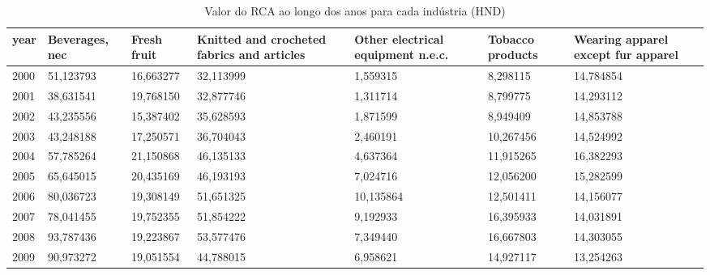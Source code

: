 \begin{table}
\centering
\caption{Valor do RCA ao longo dos anos para cada indústria (HND)}
\begin{tabular}{p{1cm}p{2cm}p{2cm}p{2cm}p{2cm}p{2cm}p{2cm}}
\toprule
 year &  Beverages, nec &  Fresh fruit &  Knitted and crocheted fabrics and articles &  Other electrical equipment n.e.c. &  Tobacco products &  Wearing apparel except fur apparel \\
\midrule
 2000 &       51,123793 &    16,663277 &                                   32,113999 &                           1,559315 &          8,298115 &                           14,784854 \\
 2001 &       38,631541 &    19,768150 &                                   32,877746 &                           1,311714 &          8,799775 &                           14,293112 \\
 2002 &       43,235556 &    15,387402 &                                   35,628593 &                           1,871599 &          8,949409 &                           14,853788 \\
 2003 &       43,248188 &    17,250571 &                                   36,704043 &                           2,460191 &         10,267456 &                           14,524992 \\
 2004 &       57,785264 &    21,150868 &                                   46,135133 &                           4,637364 &         11,915265 &                           16,382293 \\
 2005 &       65,645015 &    20,435169 &                                   46,193193 &                           7,024716 &         12,056200 &                           15,282599 \\
 2006 &       80,036723 &    19,308149 &                                   51,651325 &                          10,135864 &         12,501411 &                           14,156077 \\
 2007 &       78,041455 &    19,752355 &                                   51,854222 &                           9,192933 &         16,395933 &                           14,031891 \\
 2008 &       93,787436 &    19,223867 &                                   53,577476 &                           7,349440 &         16,667803 &                           14,303055 \\
 2009 &       90,973272 &    19,051554 &                                   44,788015 &                           6,958621 &         14,927117 &                           13,254263 \\

\end{tabular}
\end{table}
